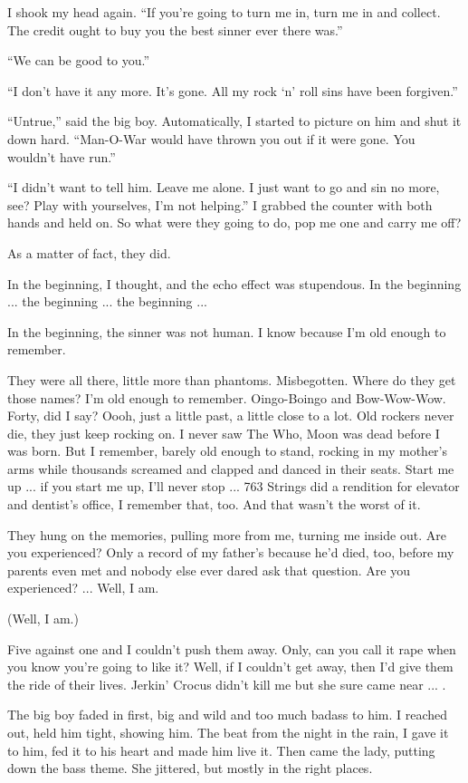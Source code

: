 I shook my head again. ``If you're going to turn me in, turn me in and collect. The credit ought to buy you the best sinner ever there was.''

``We can be good to you.''

``I don't have it any more. It's gone. All my rock `n' roll sins have been forgiven.''

``Untrue,'' said the big boy. Automatically, I started to picture on him and shut it down hard. ``Man-O-War would have thrown you out if it were gone. You wouldn't have run.''

``I didn't want to tell him. Leave me alone. I just want to go and sin no more, see? Play with yourselves, I'm not helping.'' I grabbed the counter with both hands and held on. So what were they going to do, pop me one and carry me off?

As a matter of fact, they did.

In the beginning, I thought, and the echo effect was stupendous. In the beginning ... the beginning ... the beginning ...

In the beginning, the sinner was not human. I know because I'm old enough to remember.

They were all there, little more than phantoms. Misbegotten. Where do they get those names? I'm old enough to remember. Oingo-Boingo and Bow-Wow-Wow. Forty, did I say? Oooh, just a little past, a little close to a lot. Old rockers never die, they just keep rocking on. I never saw The Who, Moon was dead before I was born. But I remember, barely old enough to stand, rocking in my mother's arms while thousands screamed and clapped and danced in their seats. Start me up ... if you start me up, I'll never stop ... 763 Strings did a rendition for elevator and dentist's office, I remember that, too. And that wasn't the worst of it.

They hung on the memories, pulling more from me, turning me inside out. Are you experienced? Only a record of my father's because he'd died, too, before my parents even met and nobody else ever dared ask that question. Are you experienced? ... Well, I am.

(Well, I am.)

Five against one and I couldn't push them away. Only, can you call it rape when you know you're going to like it? Well, if I couldn't get away, then I'd give them the ride of their lives. Jerkin' Crocus didn't kill me but she sure came near ... .

The big boy faded in first, big and wild and too much badass to him. I reached out, held him tight, showing him. The beat from the night in the rain, I gave it to him, fed it to his heart and made him live it. Then came the lady, putting down the bass theme. She jittered, but mostly in the right places.

